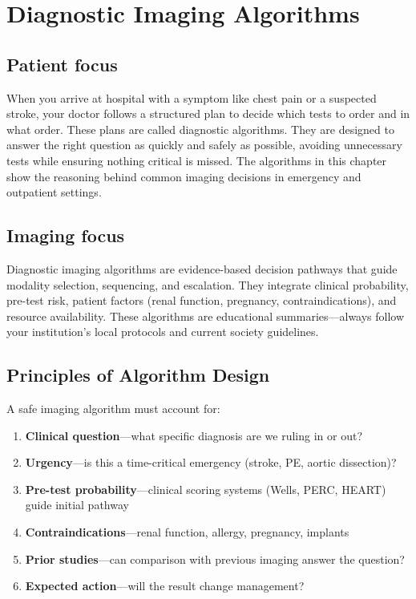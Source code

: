 \chapter{Diagnostic Imaging Algorithms}

\section*{Patient focus}
When you arrive at hospital with a symptom like chest pain or a suspected stroke, your doctor follows a structured plan to decide which tests to order and in what order. These plans are called diagnostic algorithms. They are designed to answer the right question as quickly and safely as possible, avoiding unnecessary tests while ensuring nothing critical is missed. The algorithms in this chapter show the reasoning behind common imaging decisions in emergency and outpatient settings.

\section*{Imaging focus}
Diagnostic imaging algorithms are evidence-based decision pathways that guide modality selection, sequencing, and escalation. They integrate clinical probability, pre-test risk, patient factors (renal function, pregnancy, contraindications), and resource availability. These algorithms are educational summaries---always follow your institution's local protocols and current society guidelines.
\label{ch:ch99_algorithms}

\section{Principles of Algorithm Design}
A safe imaging algorithm must account for:
\begin{enumerate}
    \item \textbf{Clinical question}---what specific diagnosis are we ruling in or out?
    \item \textbf{Urgency}---is this a time-critical emergency (stroke, PE, aortic dissection)?
    \item \textbf{Pre-test probability}---clinical scoring systems (Wells, PERC, HEART) guide initial pathway
    \item \textbf{Contraindications}---renal function, allergy, pregnancy, implants
    \item \textbf{Prior studies}---can comparison with previous imaging answer the question?
    \item \textbf{Expected action}---will the result change management?
\end{enumerate}

